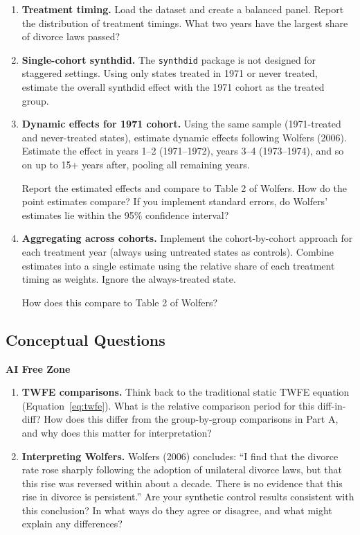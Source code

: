 \documentclass[11pt]{article}
\begin{document}
\begin{enumerate}[resume]

    \item \textbf{Treatment timing.} Load the dataset and create a balanced panel. Report the distribution of treatment timings. What two years have the largest share of divorce laws passed?


    \item \textbf{Single-cohort synthdid.} The \texttt{synthdid} package is not designed for staggered settings. Using only states treated in 1971 or never treated, estimate the overall synthdid effect with the 1971 cohort as the treated group.


    \item \textbf{Dynamic effects for 1971 cohort.} Using the same sample (1971-treated and never-treated states), estimate dynamic effects following Wolfers (2006). Estimate the effect in years 1--2 (1971--1972), years 3--4 (1973--1974), and so on up to 15+ years after, pooling all remaining years.

    Report the estimated effects and compare to Table 2 of Wolfers. How do the point estimates compare? If you implement standard errors, do Wolfers' estimates lie within the 95\% confidence interval?


    \item \textbf{Aggregating across cohorts.} Implement the cohort-by-cohort approach for each treatment year (always using untreated states as controls). Combine estimates into a single estimate using the relative share of each treatment timing as weights. Ignore the always-treated state.

    How does this compare to Table 2 of Wolfers?


\end{enumerate}

\begin{boxK}
\section*{Conceptual Questions} \textbf{AI Free Zone}

\begin{enumerate}[resume]

    \item \textbf{TWFE comparisons.} Think back to the traditional static TWFE equation (Equation~\ref{eq:twfe}). What is the relative comparison period for this diff-in-diff? How does this differ from the group-by-group comparisons in Part A, and why does this matter for interpretation?

    \item \textbf{Interpreting Wolfers.} Wolfers (2006) concludes: ``I find that the divorce rate rose sharply following the adoption of unilateral divorce laws, but that this rise was reversed within about a decade. There is no evidence that this rise in divorce is persistent.'' Are your synthetic control results consistent with this conclusion? In what ways do they agree or disagree, and what might explain any differences?

\end{enumerate}
\end{boxK}
\end{document}
